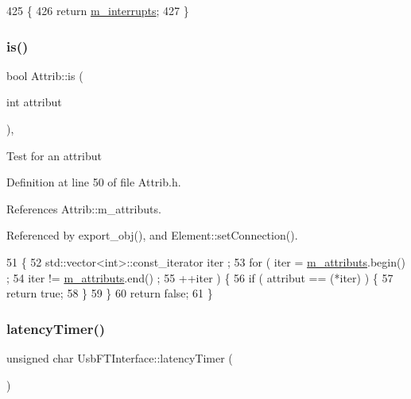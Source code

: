 \begin{DoxyCode}
425                      \{
426     \textcolor{keywordflow}{return} \hyperlink{classUsbFTInterface_a0a6e3a781ead9833a413e230c6f8d1f4}{m\_interrupts};
427   \}
\end{DoxyCode}
\mbox{\label{classAttrib_a704f26af560909ad22065083bb7d4c34}} 
\subsubsection{\texorpdfstring{is()}{is()}}
{\footnotesize\ttfamily bool Attrib\+::is (\begin{DoxyParamCaption}\item[{int}]{attribut }\end{DoxyParamCaption})\hspace{0.3cm}{\ttfamily [inline]}, {\ttfamily [inherited]}}

Test for an attribut 

Definition at line 50 of file Attrib.\+h.



References Attrib\+::m\+\_\+attributs.



Referenced by export\+\_\+obj(), and Element\+::set\+Connection().


\begin{DoxyCode}
51   \{
52     std::vector<int>::const\_iterator iter ;
53     \textcolor{keywordflow}{for} ( iter  = \hyperlink{classAttrib_ac4bd58a0cc6b38a3b711d609a3d3aacc}{m\_attributs}.begin() ;
54           iter != \hyperlink{classAttrib_ac4bd58a0cc6b38a3b711d609a3d3aacc}{m\_attributs}.end()   ;
55           ++iter ) \{
56       \textcolor{keywordflow}{if} ( attribut == (*iter) ) \{
57         \textcolor{keywordflow}{return} \textcolor{keyword}{true};
58       \}
59     \}
60     \textcolor{keywordflow}{return} \textcolor{keyword}{false};
61   \}
\end{DoxyCode}
\mbox{\label{classUsbFTInterface_a4fa70ce4a4cd4f8f01cdeb4835f11276}} 
\subsubsection{\texorpdfstring{latency\+Timer()}{latencyTimer()}}
{\footnotesize\ttfamily unsigned char Usb\+F\+T\+Interface\+::latency\+Timer (\begin{DoxyParamCaption}{ }\end{DoxyParamCaption})\hspace{0.3cm}{\ttfamily [inline]}}

